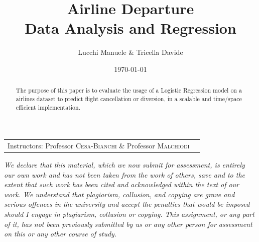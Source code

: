 \documentclass[
	letterpaper, %
	10pt, %
]{class}
\title{Airline Departure\\Data Analysis and Regression} %
\author{Lucchi Manuele \& Tricella Davide} %
\date{\today} %
\begin{document}
\maketitle %

\begin{center}
  \begin{tabular}{l r}
    Instructors: Professor \textsc{Cesa-Bianchi} \& Professor \textsc{Malchiodi}
  \end{tabular}
\end{center}


\textit{We declare that this material,
  which we now submit for assessment, is entirely our own work and has not been
  taken from the work of others, save and to the extent that such work has been cited and
  acknowledged within the text of our work. We understand that plagiarism, collusion,
  and copying are grave and serious offences in the university and accept the penalties that
  would be imposed should I engage in plagiarism, collusion or copying. This assignment,
  or any part of it, has not been previously submitted by us or any other person for
  assessment on this or any other course of study.}


\begin{abstract}
  The purpose of this paper is to evaluate the usage of a Logistic Regression model on a airlines dataset to predict flight cancellation or diversion, in a scalable and time/space efficient implementation.
\end{abstract}


\tableofcontents

\end{document}
